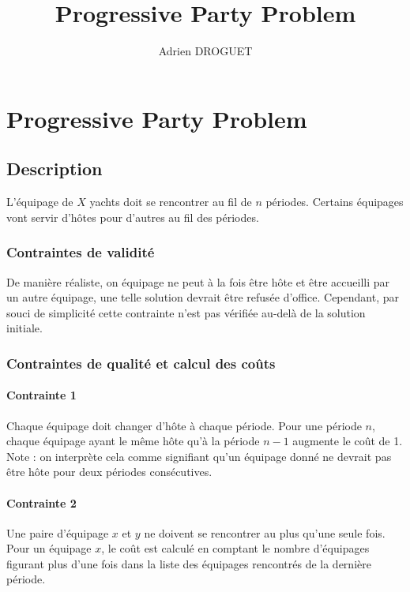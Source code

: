 \documentclass[a4paper,10pt]{report}
\title{Progressive Party Problem}
\author{Adrien DROGUET}
\begin{document}
\maketitle



\chapter{Progressive Party Problem}
\section{Description}
L'équipage de $X$ yachts doit se rencontrer au fil de $n$ périodes. Certains équipages
vont servir d'hôtes pour d'autres au fil des périodes.

\subsection{Contraintes de validité}
De manière réaliste, on équipage ne peut à la fois être hôte et être accueilli par un autre équipage,
une telle solution devrait être refusée d'office. Cependant, par souci de simplicité cette contrainte
n'est pas vérifiée au-delà de la solution initiale.


\subsection{Contraintes de qualité et calcul des coûts}
\subsubsection{Contrainte 1}
Chaque équipage doit changer d'hôte à chaque période. Pour une période $n$, chaque équipage ayant le
même hôte qu'à la période $n-1$ augmente le coût de 1. Note : on interprète cela comme signifiant
qu'un équipage donné ne devrait pas être hôte pour deux périodes consécutives.

\subsubsection{Contrainte 2}
Une paire d'équipage $x$ et $y$ ne doivent se rencontrer au plus qu'une seule fois. Pour un équipage
$x$, le coût est calculé en comptant le nombre d'équipages figurant plus d'une fois dans la liste
des équipages rencontrés de la dernière période.
\end{document}
